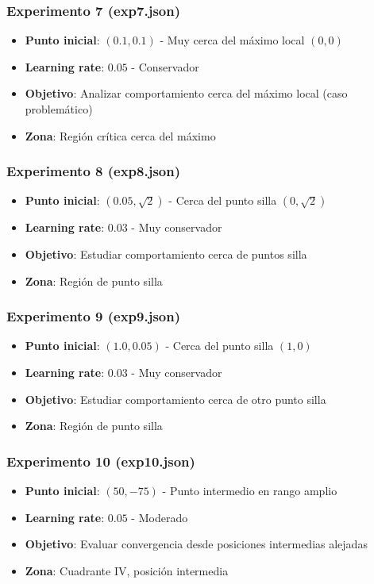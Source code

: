 \documentclass[12pt,a4paper]{article}
\begin{document}
\subsubsection*{Experimento 7 (exp7.json)}
\begin{itemize}
    \item \textbf{Punto inicial}: $(0.1, 0.1)$ - Muy cerca del máximo local $(0,0)$
    \item \textbf{Learning rate}: $0.05$ - Conservador
    \item \textbf{Objetivo}: Analizar comportamiento cerca del máximo local (caso problemático)
    \item \textbf{Zona}: Región crítica cerca del máximo
\end{itemize}

\subsubsection*{Experimento 8 (exp8.json)}
\begin{itemize}
    \item \textbf{Punto inicial}: $(0.05, \sqrt{2})$ - Cerca del punto silla $(0, \sqrt{2})$
    \item \textbf{Learning rate}: $0.03$ - Muy conservador
    \item \textbf{Objetivo}: Estudiar comportamiento cerca de puntos silla
    \item \textbf{Zona}: Región de punto silla
\end{itemize}

\subsubsection*{Experimento 9 (exp9.json)}
\begin{itemize}
    \item \textbf{Punto inicial}: $(1.0, 0.05)$ - Cerca del punto silla $(1, 0)$
    \item \textbf{Learning rate}: $0.03$ - Muy conservador
    \item \textbf{Objetivo}: Estudiar comportamiento cerca de otro punto silla
    \item \textbf{Zona}: Región de punto silla
\end{itemize}

\subsubsection*{Experimento 10 (exp10.json)}
\begin{itemize}
    \item \textbf{Punto inicial}: $(50, -75)$ - Punto intermedio en rango amplio
    \item \textbf{Learning rate}: $0.05$ - Moderado
    \item \textbf{Objetivo}: Evaluar convergencia desde posiciones intermedias alejadas
    \item \textbf{Zona}: Cuadrante IV, posición intermedia
\end{itemize}
\end{document}
